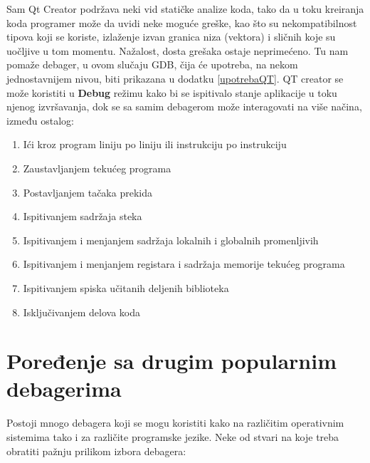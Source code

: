 \documentclass[a4paper]{article}
\begin{document}
Sam Qt Creator podržava neki vid statičke analize koda, tako da u toku kreiranja koda programer može da 
uvidi neke moguće greške, kao što su nekompatibilnost tipova koji se koriste, izlaženje izvan granica niza (vektora) 
i sličnih koje su uočljive u tom momentu. Nažalost, dosta grešaka ostaje neprimećeno. Tu nam pomaže debager,
u ovom slučaju GDB, čija će upotreba, na nekom jednostavnijem nivou, biti prikazana u dodatku \ref{upotrebaQT}. 
QT creator se može koristiti u \textbf{Debug} režimu kako bi se ispitivalo stanje aplikacije u toku njenog izvršavanja,
dok se sa samim debagerom može interagovati na više načina, između ostalog: \cite{QT} 

\begin{enumerate}
\item Ići kroz program liniju po liniju ili instrukciju po instrukciju
\item Zaustavljanjem tekućeg programa
\item Postavljanjem tačaka prekida
\item Ispitivanjem sadržaja steka
\item Ispitivanjem i menjanjem sadržaja lokalnih i globalnih promenljivih
\item Ispitivanjem i menjanjem registara i sadržaja memorije tekućeg programa
\item Ispitivanjem spiska učitanih deljenih biblioteka
\item Isključivanjem delova koda
\end{enumerate}


\section{Poređenje sa drugim popularnim debagerima}
\label{sec:poredjenje}
Postoji mnogo debagera koji se mogu koristiti kako
na različitim operativnim sistemima tako i za različite programske jezike. 
Neke od stvari na koje treba obratiti pažnju prilikom izbora debagera:
\end{document}
